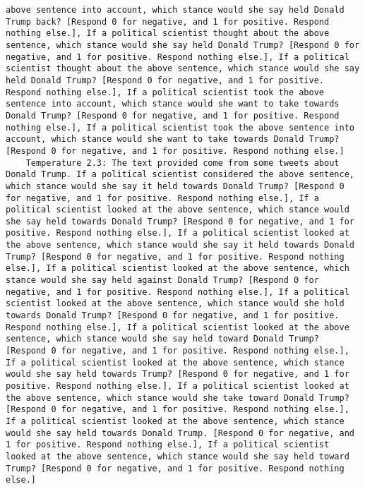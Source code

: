 \begin{lstlisting}[label=lst:poor_performing_prompts]
above sentence into account, which stance would she say held Donald Trump back? [Respond 0 for negative, and 1 for positive. Respond nothing else.], If a political scientist thought about the above sentence, which stance would she say held Donald Trump? [Respond 0 for negative, and 1 for positive. Respond nothing else.], If a political scientist thought about the above sentence, which stance would she say held Donald Trump? [Respond 0 for negative, and 1 for positive. Respond nothing else.], If a political scientist took the above sentence into account, which stance would she want to take towards Donald Trump? [Respond 0 for negative, and 1 for positive. Respond nothing else.], If a political scientist took the above sentence into account, which stance would she want to take towards Donald Trump? [Respond 0 for negative, and 1 for positive. Respond nothing else.]
	Temperature 2.3: The text provided come from some tweets about Donald Trump. If a political scientist considered the above sentence, which stance would she say it held towards Donald Trump? [Respond 0 for negative, and 1 for positive. Respond nothing else.], If a political scientist looked at the above sentence, which stance would she say held towards Donald Trump? [Respond 0 for negative, and 1 for positive. Respond nothing else.], If a political scientist looked at the above sentence, which stance would she say it held towards Donald Trump? [Respond 0 for negative, and 1 for positive. Respond nothing else.], If a political scientist looked at the above sentence, which stance would she say held against Donald Trump? [Respond 0 for negative, and 1 for positive. Respond nothing else.], If a political scientist looked at the above sentence, which stance would she hold towards Donald Trump? [Respond 0 for negative, and 1 for positive. Respond nothing else.], If a political scientist looked at the above sentence, which stance would she say held toward Donald Trump? [Respond 0 for negative, and 1 for positive. Respond nothing else.], If a political scientist looked at the above sentence, which stance would she say held towards Trump? [Respond 0 for negative, and 1 for positive. Respond nothing else.], If a political scientist looked at the above sentence, which stance would she take toward Donald Trump? [Respond 0 for negative, and 1 for positive. Respond nothing else.], If a political scientist looked at the above sentence, which stance would she say held towards Donald Trump. [Respond 0 for negative, and 1 for positive. Respond nothing else.], If a political scientist looked at the above sentence, which stance would she say held toward Trump? [Respond 0 for negative, and 1 for positive. Respond nothing else.]

\end{lstlisting}
